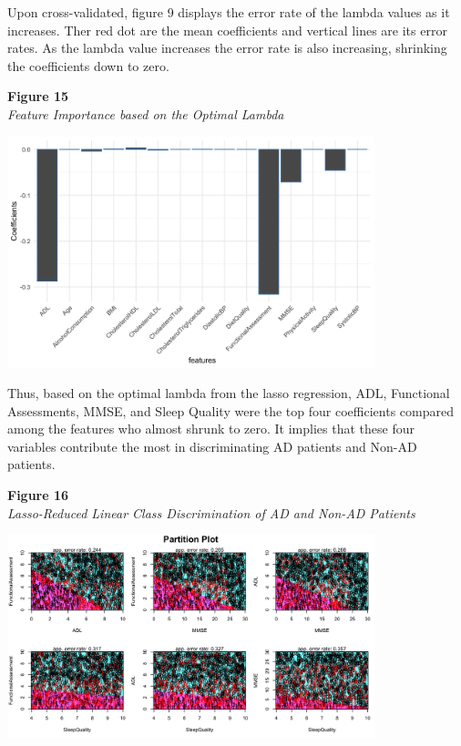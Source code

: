 \documentclass[12pt]{article}
\begin{document}
Upon cross-validated, figure 9 displays the error rate of the lambda values as it increases. Ther red dot are the mean coefficients and vertical lines are its error rates. As the lambda value increases the error rate is also increasing, shrinking the coefficients down to zero. 

\noindent
\textbf{Figure 15}\\
\textit{Feature Importance based on the Optimal Lambda}
\begin{center}
    \includegraphics[width = 0.8\textwidth]{Lasso Feature Selection.png}
\end{center}

Thus, based on the optimal lambda from the lasso regression, ADL, Functional Assessments, MMSE, and Sleep Quality were the top four coefficients compared among the features who almost shrunk to zero. It implies that these four variables contribute the most in discriminating AD patients and Non-AD patients. 

\noindent
\textbf{Figure 16} \\
\textit{Lasso-Reduced Linear Class Discrimination of AD and Non-AD Patients}
\begin{center}
    \includegraphics[width = 0.8\textwidth]{Lasso_Reduced_LDA.png}
\end{center}
\end{document}
